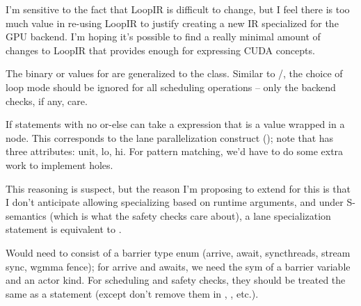 \newpage
{}

I'm sensitive to the fact that LoopIR is difficult to change, but I feel there is too much value in re-using LoopIR to justify creating a new IR specialized for the GPU backend.
I'm hoping it's possible to find a really minimal amount of changes to LoopIR that provides enough for expressing CUDA concepts.

\filbreak
{}

 The binary  or  values for  are generalized to the  class.
Similar to /, the choice of loop mode should be ignored for all scheduling operations -- only the backend checks, if any, care.

\filbreak
{} If statements with no or-else can take a  expression that is a  value wrapped in a  node.
This corresponds to the lane parallelization construct (); note that  has three attributes: unit, lo, hi.
For pattern matching, we'd have to do some extra work to implement holes.

\filbreak
This reasoning is suspect, but the reason I'm proposing to extend  for this is that I don't anticipate allowing specializing based on runtime arguments, and under S-semantics (which is what the safety checks care about), a lane specialization statement is equivalent to .

\filbreak
{} Would need to consist of a barrier type enum (arrive, await, syncthreads, stream sync, wgmma fence); for arrive and awaits, we need the sym of a barrier variable and an actor kind.
For scheduling and safety checks, they should be treated the same as a  statement (except don't remove them in , , etc.).

